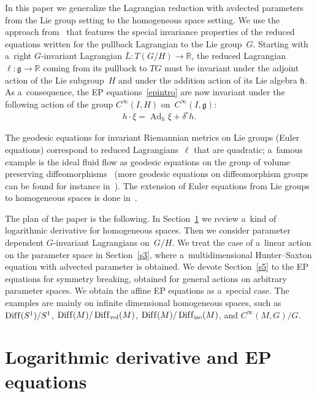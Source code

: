 \documentclass[10pt,a4paper]{amsart}
\numberwithin{equation}{section}
\begin{document}
In this paper we generalize the Lagrangian reduction with avdected parameters from the Lie group setting to the
homogeneous space setting.
We use the approach from~\cite{TV} that features the special invariance properties of the reduced equations written for
the pullback Lagrangian to the Lie group~$G$.
Starting with a~right $G$-invariant Lagrangian $\bar L:T(G/H)\to\mathbb R$, the reduced Lagrangian $\ell:\mathfrak
g\to\mathbb R$ coming from its pullback to $TG$ must be invariant under the adjoint action of the Lie subgroup~$H$ and
under the addition action of its Lie algebra $\mathfrak h$.
As a~consequence, the EP equations~\eqref{epintro} are now invariant under the following action of the group
$C^{\infty}(I,H)$ on~$C^{\infty}(I,\mathfrak g)$:
\begin{gather*}
h\cdot \xi=\operatorname{Ad}_h\xi+\delta^rh.
\end{gather*}

The geodesic equations for invariant Riemannian metrics on Lie groups (Euler equations) correspond to reduced
Lagrangians~$\ell$ that are quadratic; a~famous example is the ideal f\/luid f\/low as geodesic equations on the group of
volume preserving dif\/feomorphisms~\cite{Arnold} (more geodesic equations on dif\/feomorphism groups can be found for
instance in~\cite{Vizman}).
The extension of Euler equations from Lie groups to homogeneous spaces is done in~\cite{KM}.

The plan of the paper is the following.
In Section~\ref{s2} we review a~kind of logarithmic derivative for homogeneous spaces.
Then we consider parameter dependent $G$-invariant Lagrangians on~$G/H$.
We treat the case of a~linear action on the parameter space in Section~\ref{s3}, where a~multidimensional Hunter--Saxton
equation with advected parameter is obtained.
We devote Section~\ref{s5} to the EP equations for symmetry breaking, obtained for general actions on arbitrary
parameter spaces.
We obtain the af\/f\/ine EP equations as a~special case.
The examples are mainly on inf\/inite dimensional homogeneous spaces, such as $\operatorname{Dif\/f}(S^1)/S^1$,
$\operatorname{Dif\/f}(M)/\operatorname{Dif\/f}_{\operatorname{vol}}(M)$,
$\operatorname{Dif\/f}(M)/\operatorname{Dif\/f}_{\operatorname{iso}}(M)$, and $C^{\infty}(M,G)/G$.

\section{Logarithmic derivative and EP equations}
\label{s2}
\end{document}
